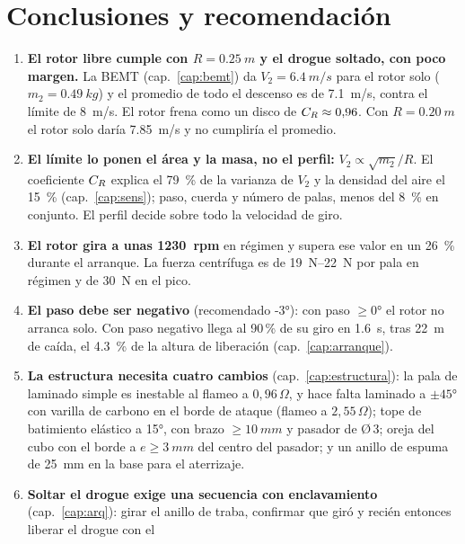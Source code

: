 \chapter{Conclusiones y recomendación}\label{cap:concl}

\begin{enumerate}
  \item \textbf{El rotor libre cumple  con $R=\SI{0.25}{m}$ y el drogue soltado, con
        poco margen.} La BEMT (cap.~\ref{cap:bemt}) da $V_2=\SI{6.4}{m/s}$ para el rotor solo
        ($m_2=\SI{0.49}{kg}$) y el promedio de todo el descenso es de \SI{7.1}{m/s}, contra el
        límite de \SI{8}{m/s}. El rotor frena como un disco de $C_{R}\approx0{,}96$. Con
        $R=\SI{0.20}{m}$ el rotor solo daría \SI{7.85}{m/s} y no cumpliría el promedio.
  \item \textbf{El límite lo ponen el área y la masa, no el perfil:} $V_2\propto\sqrt{m_2}/R$. El
        coeficiente $C_{R}$ explica el \SI{79}{\percent} de la varianza de $V_2$ y la densidad
        del aire el \SI{15}{\percent} (cap.~\ref{cap:sens}); paso, cuerda y número de palas, menos
        del \SI{8}{\percent} en conjunto. El perfil decide sobre todo la velocidad de giro.
  \item \textbf{El rotor gira a unas \SI{1230}{rpm}} en régimen y supera ese valor en un
        \SI{26}{\percent} durante el arranque. La fuerza centrífuga es de \SIrange{19}{22}{N} por
        pala en régimen y de \SI{30}{N} en el pico.
  \item \textbf{El paso debe ser negativo} (recomendado \ang{-3}): con paso $\ge\ang{0}$ el rotor
        no arranca solo. Con paso negativo llega al 90\,\% de su giro en \SI{1.6}{s}, tras
        \SI{22}{m} de caída, el \SI{4.3}{\percent} de la altura de liberación
        (cap.~\ref{cap:arranque}).
  \item \textbf{La estructura necesita cuatro cambios} (cap.~\ref{cap:estructura}): la pala de
        laminado simple es inestable al flameo a $0{,}96\,\Omega$, y hace falta laminado a
        $\pm\ang{45}$ con varilla de carbono en el borde de ataque (flameo a $2{,}55\,\Omega$);
        tope de batimiento elástico a \ang{+15}, con brazo $\ge\SI{10}{mm}$ y pasador de Ø\,3;
        oreja del cubo con el borde a $e\ge\SI{3}{mm}$ del centro del pasador; y un anillo de
        espuma de \SI{25}{mm} en la base para el aterrizaje.
  \item \textbf{Soltar el drogue exige una secuencia con enclavamiento} (cap.~\ref{cap:arq}):
        girar el anillo de traba, confirmar que giró y recién entonces liberar el drogue con el

\end{enumerate}
